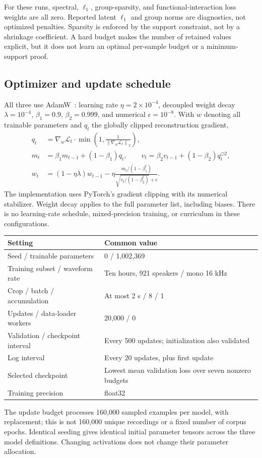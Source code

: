 \documentclass[11pt,a4paper]{article}
\newcommand{\norm}[1]{\left\lVert#1\right\rVert}
\begin{document}
For these runs, spectral, $\ell_1$, group-sparsity, and functional-interaction loss weights are all zero. Reported latent $\ell_1$ and group norms are diagnostics, not optimized penalties. Sparsity is enforced by the support constraint, not by a shrinkage coefficient. A hard budget makes the number of retained values explicit, but it does not learn an optimal per-sample budget or a minimum-support proof.

\subsection{Optimizer and update schedule}
All three use AdamW~\cite{loshchilov2019}: learning rate $\eta=2\times10^{-4}$, decoupled weight decay $\lambda=10^{-4}$, $\beta_1=0.9$, $\beta_2=0.999$, and numerical $\epsilon=10^{-8}$. With $w$ denoting all trainable parameters and $q_t$ the globally clipped reconstruction gradient,
\begin{align}
 q_t&=\nabla_w\mathcal L_t\cdot\min\!\left(1,\frac{1}{\norm{\nabla_w\mathcal L_t}_2}\right),\\
 m_t&=\beta_1m_{t-1}+(1-\beta_1)q_t,\qquad
 v_t=\beta_2v_{t-1}+(1-\beta_2)q_t^{\odot2},\\
 w_t&=(1-\eta\lambda)w_{t-1}
 -\eta\frac{m_t/(1-\beta_1^t)}{\sqrt{v_t/(1-\beta_2^t)}+\epsilon}.
\end{align}
The implementation uses PyTorch's gradient clipping with its numerical stabilizer. Weight decay applies to the full parameter list, including biases. There is no learning-rate schedule, mixed-precision training, or curriculum in these configurations.

\begin{center}
\begin{tabularx}{\linewidth}{lY}
\toprule
Setting & Common value \\
\midrule
Seed / trainable parameters & 0 / 1,002,369 \\
Training subset / waveform rate & Ten hours, 921 speakers / mono 16 kHz \\
Crop / batch / accumulation & At most 2 s / 8 / 1 \\
Updates / data-loader workers & 20,000 / 0 \\
Validation / checkpoint interval & Every 500 updates; initialization also validated \\
Log interval & Every 20 updates, plus first update \\
Selected checkpoint & Lowest mean validation loss over seven nonzero budgets \\
Training precision & float32 \\
\bottomrule
\end{tabularx}
\end{center}
The update budget processes 160,000 sampled examples per model, with replacement; this is not 160,000 unique recordings or a fixed number of corpus epochs. Identical seeding gives identical initial parameter tensors across the three model definitions. Changing activations does not change their parameter allocation.
\end{document}
